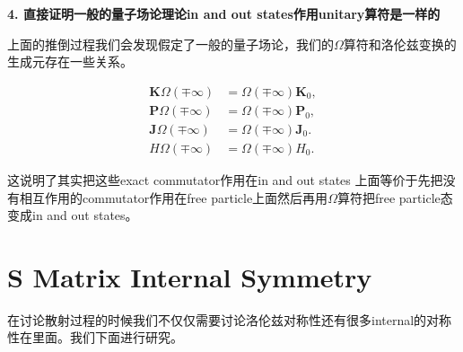 \textbf{4. 直接证明一般的量子场论理论in and out states作用unitary算符是一样的}

上面的推倒过程我们会发现假定了一般的量子场论，我们的$ \Omega $算符和洛伦兹变换的生成元存在一些关系。

\begin{equation}
  \begin{aligned}
    \mathbf{K}\Omega(\mp\infty)&=\Omega(\mp\infty)\mathbf{K}_0,\\
    \mathbf{P}\Omega(\mp\infty)&=\Omega(\mp\infty)\mathbf{P}_0,\\
    \mathbf{J}\Omega(\mp\infty)&=\Omega(\mp\infty)\mathbf{J}_0.\\ 
    H\Omega(\mp\infty)&=\Omega(\mp\infty)H_0.
  \end{aligned}
  \label{eq:relaomega}
\end{equation}

这说明了其实把这些exact commutator作用在in and out states 上面等价于先把没有相互作用的commutator作用在free particle上面然后再用$ \Omega $算符把free particle态变成in and out states。







\section{S Matrix Internal Symmetry}\label{sec:S Matrix Internal Symmetry} %

在讨论散射过程的时候我们不仅仅需要讨论洛伦兹对称性还有很多internal的对称性在里面。我们下面进行研究。





